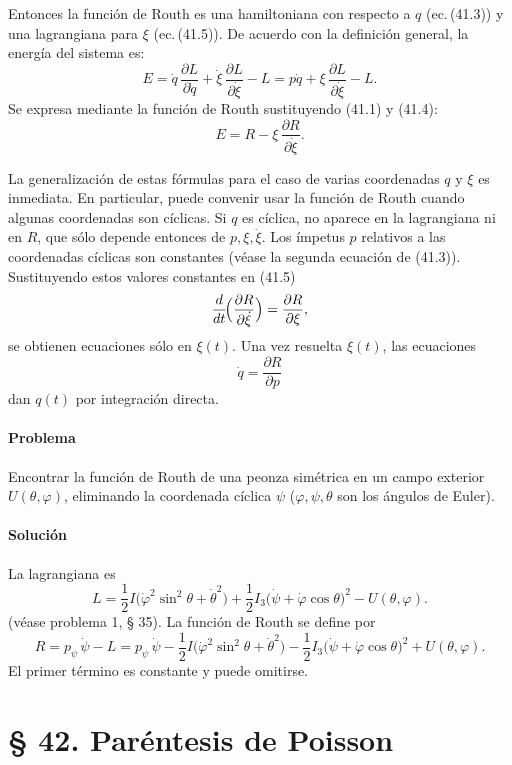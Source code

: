 \documentclass[12pt]{article}
\begin{document}
Entonces la función de Routh es una hamiltoniana con respecto a \(q\) (ec.\,(41.3)) y una lagrangiana para \(\xi\) (ec.\,(41.5)).
De acuerdo con la definición general, la energía del sistema es:
\[
E = \dot q\,\frac{\partial L}{\partial \dot q}
  + \dot\xi\,\frac{\partial L}{\partial \dot\xi}
  - L
  = p\dot q + \xi\,\frac{\partial L}{\partial \dot\xi} - L.
\]
Se expresa mediante la función de Routh sustituyendo (41.1) y (41.4):
\begin{equation}
E = R - \xi\,\frac{\partial R}{\partial \dot\xi}.
\tag{41.6}
\end{equation}

La generalización de estas fórmulas para el caso de varias coordenadas \(q\) y \(\xi\) es inmediata.  
En particular, puede convenir usar la función de Routh cuando algunas coordenadas son cíclicas. Si \(q\) es cíclica, no aparece en la lagrangiana ni en \(R\), que sólo depende entonces de \(p,\xi,\dot\xi\). Los ímpetus \(p\) relativos a las coordenadas cíclicas son constantes (véase la segunda ecuación de (41.3)). Sustituyendo estos valores constantes en (41.5)
\[
\frac{d}{dt}\!\Bigl(\frac{\partial R}{\partial \dot\xi}\Bigr)
= \frac{\partial R}{\partial \xi},
\]
se obtienen ecuaciones sólo en \(\xi(t)\). Una vez resuelta \(\xi(t)\), las ecuaciones
\[
\dot q = \frac{\partial R}{\partial p}
\]
dan \(q(t)\) por integración directa.

\paragraph*{Problema}  
Encontrar la función de Routh de una peonza simétrica en un campo exterior \(U(\theta,\varphi)\), eliminando la coordenada cíclica \(\psi\) (\(\varphi,\psi,\theta\) son los ángulos de Euler).

\paragraph*{Solución}  
La lagrangiana es
\[
L = \frac12 I\bigl(\dot\varphi^2\sin^2\theta + \dot\theta^2\bigr)
  + \frac12 I_3\bigl(\dot\psi + \dot\varphi\cos\theta\bigr)^2
  - U(\theta,\varphi).
\]
(véase problema 1, § 35). La función de Routh se define por
\[
R = p_\psi\,\dot\psi - L
= p_\psi\,\dot\psi
- \frac12 I\bigl(\dot\varphi^2\sin^2\theta + \dot\theta^2\bigr)
- \frac12 I_3\bigl(\dot\psi + \dot\varphi\cos\theta\bigr)^2
+ U(\theta,\varphi).
\]
El primer término es constante y puede omitirse.

\section*{§ 42. Paréntesis de Poisson}
\end{document}
